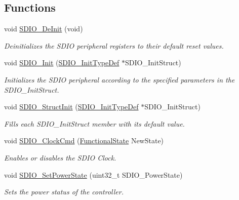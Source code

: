 \subsection*{Functions}
\begin{DoxyCompactItemize}
\item 
void \hyperlink{group___s_d_i_o___exported___functions_gac359d2c6c67a2590f8f9b720c0e4ff1b}{S\+D\+I\+O\+\_\+\+De\+Init} (void)
\begin{DoxyCompactList}\small\item\em Deinitializes the S\+D\+IO peripheral registers to their default reset values. \end{DoxyCompactList}\item 
void \hyperlink{group___s_d_i_o___exported___functions_gad40764a8e37c0ed5c9141ae338ff0203}{S\+D\+I\+O\+\_\+\+Init} (\hyperlink{struct_s_d_i_o___init_type_def}{S\+D\+I\+O\+\_\+\+Init\+Type\+Def} $\ast$S\+D\+I\+O\+\_\+\+Init\+Struct)
\begin{DoxyCompactList}\small\item\em Initializes the S\+D\+IO peripheral according to the specified parameters in the S\+D\+I\+O\+\_\+\+Init\+Struct. \end{DoxyCompactList}\item 
void \hyperlink{group___s_d_i_o___exported___functions_ga778d338c29df4fae9ef69432e6df32ad}{S\+D\+I\+O\+\_\+\+Struct\+Init} (\hyperlink{struct_s_d_i_o___init_type_def}{S\+D\+I\+O\+\_\+\+Init\+Type\+Def} $\ast$S\+D\+I\+O\+\_\+\+Init\+Struct)
\begin{DoxyCompactList}\small\item\em Fills each S\+D\+I\+O\+\_\+\+Init\+Struct member with its default value. \end{DoxyCompactList}\item 
void \hyperlink{group___s_d_i_o___exported___functions_ga7243b857d6b323748ff3a493b265bedc}{S\+D\+I\+O\+\_\+\+Clock\+Cmd} (\hyperlink{group___exported__types_gac9a7e9a35d2513ec15c3b537aaa4fba1}{Functional\+State} New\+State)
\begin{DoxyCompactList}\small\item\em Enables or disables the S\+D\+IO Clock. \end{DoxyCompactList}\item 
void \hyperlink{group___s_d_i_o___exported___functions_ga36ecca32b904de74218fbe65cd5f5270}{S\+D\+I\+O\+\_\+\+Set\+Power\+State} (uint32\+\_\+t S\+D\+I\+O\+\_\+\+Power\+State)
\begin{DoxyCompactList}\small\item\em Sets the power status of the controller. \end{DoxyCompactList}\item 

\end{DoxyCompactItemize}
